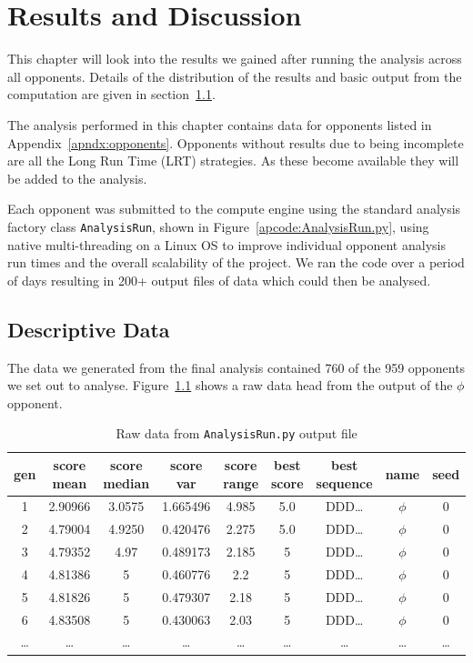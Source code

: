 \chapter{Results and Discussion}\label{ch:results}
This chapter will look into the results we gained after running the analysis across all opponents.
Details of the distribution of the results and basic output from the computation are given in section~\ref{sec:descriptive_data}.

The analysis performed in this chapter contains data for opponents listed in Appendix~\ref{apndx:opponents}.
Opponents without results due to being incomplete are all the Long Run Time (LRT) strategies.
As these become available they will be added to the analysis.

Each opponent was submitted to the compute engine using the standard analysis factory class \texttt{AnalysisRun}, shown in Figure~\ref{apcode:AnalysisRun.py}, using native multi-threading on a Linux OS to improve individual opponent analysis run times and the overall scalability of the project.
We ran the code over a period of days resulting in 200+ output files of data which could then be analysed.

\section{Descriptive Data}\label{sec:descriptive_data}
The data we generated from the final analysis contained 760 of the 959 opponents we set out to analyse.
Figure~\ref{table:data_dump} shows a raw data head from the output of the $\phi$ opponent.

\begin{table}[ht]
    \centering
    \begin{tabular}{ccccccccc}
        \toprule
        gen & score mean & score median & score var & score range & best score & best sequence &  name & seed \\
        \midrule
        1 & 2.90966 & 3.0575 & 1.665496 & 4.985 & 5.0 & DDD\ldots & $\phi$ & 0 \\
        2 & 4.79004 & 4.9250 & 0.420476 & 2.275 & 5.0 & DDD\ldots & $\phi$ & 0\\
        3 & 4.79352 & 4.97 & 0.489173 & 2.185 & 5 & DDD\ldots & $\phi$ & 0\\
        4 & 4.81386 & 5 & 0.460776 & 2.2 & 5 & DDD\ldots & $\phi$ & 0\\
        5 & 4.81826 & 5 & 0.479307 & 2.18 & 5 & DDD\ldots & $\phi$ & 0\\
        6 & 4.83508 & 5 & 0.430063 & 2.03 & 5 & DDD\ldots & $\phi$ & 0\\
        \ldots & \ldots & \ldots & \ldots & \ldots & \ldots & \ldots & \ldots & \ldots\\        
        \bottomrule
    \end{tabular}
    \caption{Raw data from \texttt{AnalysisRun.py} output file}\label{table:data_dump}
\end{table}

